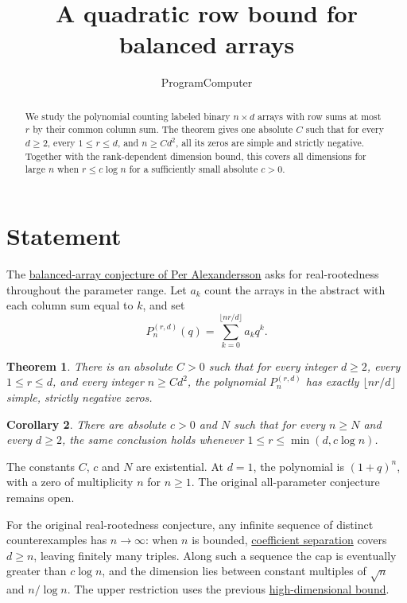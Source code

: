 \documentclass[11pt]{article}
\title{A quadratic row bound for balanced arrays}
\author{ProgramComputer}
\date{}
\newtheorem{theorem}{Theorem}
\newtheorem{corollary}[theorem]{Corollary}
\begin{document}
\maketitle

\begin{abstract}
We study the polynomial counting labeled binary $n\times d$ arrays with row sums
at most $r$ by their common column sum. The theorem gives one
absolute $C$ such that for every $d\ge2$, every $1\le r\le d$, and $n\ge Cd^2$,
all its zeros are simple and strictly negative. Together with the rank-dependent
dimension bound, this covers all dimensions for large $n$ when $r\le c\log n$
for a sufficiently small absolute $c>0$.
\end{abstract}

\section{Statement}
The \href{https://www.symmetricfunctions.com/realRootedOpenProblems.htm\#conjBalancedArrays}{balanced-array conjecture of Per Alexandersson}
asks for real-rootedness throughout the parameter range. Let $a_k$ count the
arrays in the abstract with each column sum equal to $k$, and set
\[
P_n^{(r,d)}(q)=\sum_{k=0}^{\lfloor nr/d\rfloor}a_kq^k.
\]
\begin{theorem}
There is an absolute $C>0$ such that for every integer $d\ge2$, every
$1\le r\le d$, and every integer $n\ge Cd^2$, the polynomial $P_n^{(r,d)}$
has exactly $\lfloor nr/d\rfloor$ simple, strictly negative zeros.
\end{theorem}
\begin{corollary}
There are absolute $c>0$ and $N$ such that for every $n\ge N$ and every $d\ge2$,
the same conclusion holds whenever $1\le r\le\min(d,c\log n)$.
\end{corollary}
The constants $C$, $c$ and $N$ are existential. At $d=1$, the polynomial is $(1+q)^n$, with a zero of multiplicity $n$ for $n\ge1$. The original all-parameter conjecture remains open.

For the original real-rootedness conjecture, any infinite sequence of
distinct counterexamples has $n\to\infty$: when $n$ is bounded,
\href{https://github.com/ProgramComputer/open-math-research/blob/04564a728c21eab6ce511b98a48ccaac754648ff/topics/balanced-arrays/orientation-normalization.md}{coefficient separation}
covers $d\ge n$, leaving finitely many triples. Along such a sequence the
cap is eventually greater than $c\log n$, and the dimension lies between
constant multiples of $\sqrt n$ and $n/\log n$. The upper restriction uses
the previous \href{https://github.com/ProgramComputer/open-math-research/tree/04564a728c21eab6ce511b98a48ccaac754648ff/topics/balanced-arrays/dense-regime}{high-dimensional bound}.



\appendix
\clearpage



\end{document}
